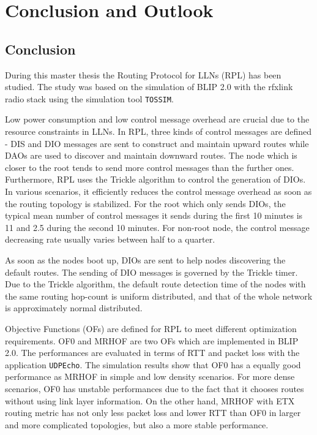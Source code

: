 \chapter{Conclusion and Outlook}
\label{Con}
\section{Conclusion}
\label{Con:Con}

During this master thesis the Routing Protocol for LLNs (RPL) has been studied. The study was based on the simulation of BLIP 2.0 with the rfxlink radio stack using the simulation tool \texttt{TOSSIM}.

Low power consumption and low control message overhead are crucial due to the resource constraints in LLNs. In RPL, three kinds of control messages are defined - DIS and DIO messages are sent to construct and maintain upward routes while DAOs are used to discover and maintain downward routes. The node which is closer to the root tends to send more control messages than the further ones. Furthermore, RPL uses the Trickle algorithm to control the generation of DIOs. In various scenarios, it efficiently reduces the control message overhead as soon as the routing topology is stabilized. For the root which only sends DIOs, the typical mean number of control messages it sends during the first 10 minutes is 11 and 2.5 during the second 10 minutes. For non-root node, the control message decreasing rate usually varies between half to a quarter.

As soon as the nodes boot up, DIOs are sent to help nodes discovering the default routes. The sending of DIO messages is governed by the Trickle timer. Due to the Trickle algorithm, the default route detection time of the nodes with the same routing hop-count is uniform distributed, and that of the whole network is approximately normal distributed.


Objective Functions (OFs) are defined for RPL to meet different optimization requirements. OF0 and MRHOF are two OFs which are implemented in BLIP 2.0. The performances are evaluated in terms of RTT and packet loss with the application \texttt{UDPEcho}. The simulation results show that OF0 has a equally good performance as MRHOF in simple and low density scenarios. For more dense scenarios, OF0 has unstable performances due to the fact that it chooses routes without using link layer information. On the other hand, MRHOF with ETX routing metric has not only less packet loss and lower RTT than OF0 in larger and more complicated topologies, but also a more stable performance.

